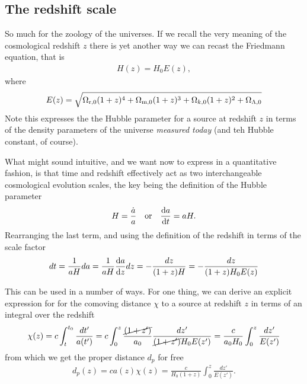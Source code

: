\subsection{The redshift scale}

So much for the zoology of the universes.
If we recall the very meaning of the cosmological redshift $z$ there is yet another
way we can recast the Friedmann equation, that is
\begin{align}
  H(z) = H_0 E(z),
\end{align}
where
\begin{align}
  E(z) = \sqrt{\Omega_\text{r,0} (1 + z)^4 + \Omega_\text{m,0} (1 + z)^3 +
    \Omega_{k,0} (1 + z)^2 + \Omega_{\Lambda,0}}
\end{align}
Note this expresses the the Hubble parameter for a source at redshift $z$ in terms
of the density parameters of the universe \emph{measured today} (and teh Hubble
constant, of course).

What might sound intuitive, and we want now to express in a quantitative fashion, is
that time and redshift effectively act as two interchangeable cosmological evolution
scales, the key being the definition of the Hubble parameter
\begin{align*}
  H = \frac{\dot{a}}{a}
  \quad\text{or}\quad
  \dv{a}{t} = aH.
\end{align*}
Rearranging the last term, and using the definition of the redshift in terms of the
scale factor
\begin{align*}
  dt = \frac{1}{aH} da = \frac{1}{aH} \dv{a}{z} dz =
  -\frac{dz}{(1 + z) H} = -\frac{dz}{(1 + z) H_0 E(z)}
\end{align*}

This can be used in a number of ways. For one thing, we can derive an explicit
expression for for the comoving distance $\chi$ to a source at redshift $z$ in terms
of an integral over the redshift
\begin{align}\label{eq:comoving_distance_z}
  \chi(z) = c  \int_t^{t_0} \frac{dt'}{a(t')} =
  c   \int_0^z \frac{\cancel{(1 + z')}}{a_0} \frac{dz'}{\cancel{(1 + z')} H_0 E(z')} =
  \frac{c}{a_0 H_0} \int_0^z \frac{dz'}{E(z')}
\end{align}\label{eq:proper_distance_z}
from which we get the proper distance $d_p$ for free
\begin{align}
  d_p(z) = c a(z) \chi(z) = \frac{c}{H_0 (1 + z)} \int_0^z \frac{dz'}{E(z')}.
\end{align}

